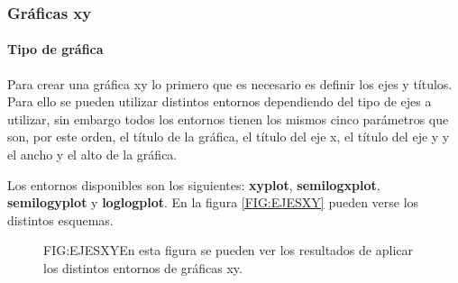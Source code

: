 \subsubsection{Gráficas xy}

\paragraph{Tipo de gráfica}

Para crear una gráfica xy lo primero que es necesario es definir los ejes y títulos. Para ello se pueden utilizar distintos entornos dependiendo del tipo de ejes a utilizar, sin embargo todos los entornos tienen los mismos cinco parámetros que son, por este orden, el título de la gráfica, el título del eje x, el título del eje y y el ancho y el alto de la gráfica.

Los entornos disponibles son los siguientes: \textbf{xyplot}, \textbf{semilogxplot}, \textbf{semilogyplot} y \textbf{loglogplot}. En la figura \ref{FIG:EJESXY} pueden verse los distintos esquemas.

\begin{figure}[Esquemas de ejes de gráficas XY]{FIG:EJESXY}{En esta figura se pueden ver los resultados de aplicar los distintos entornos de gráficas xy.}

\end{figure}

